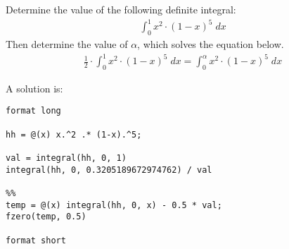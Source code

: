 \begin{ex}
Determine the value of the following definite integral:
\begin{align*}
\int_0^1 x^2 \cdot  (1 - x)^5 \; dx
\end{align*}
Then determine the value of $\alpha$, which solves the 
equation below.
\begin{align*}
\frac{1}{2} \cdot \int_0^1 x^2 \cdot  (1 - x)^5 \; dx = \int_0^\alpha x^2 \cdot  (1 - x)^5 \; dx
\end{align*}
\begin{hint}
\end{hint}
\begin{sol}
A solution is:
\begin{lstlisting}
format long

hh = @(x) x.^2 .* (1-x).^5;

val = integral(hh, 0, 1)
integral(hh, 0, 0.3205189672974762) / val

%%
temp = @(x) integral(hh, 0, x) - 0.5 * val;
fzero(temp, 0.5)

format short
\end{lstlisting}
\end{sol}
\end{ex}


